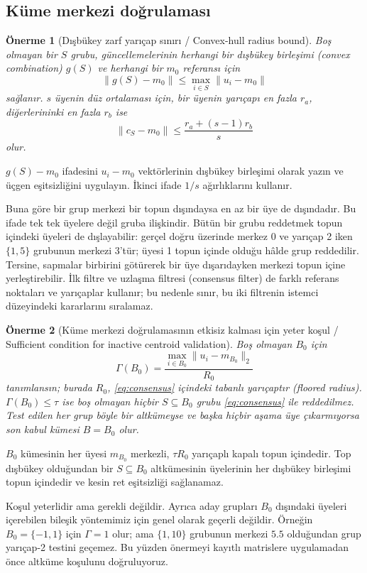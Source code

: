 \documentclass[journal]{IEEEtran}
\newtheorem{proposition}{Önerme}
\begin{document}
\subsection{Küme merkezi doğrulaması}
\begin{proposition}[Dışbükey zarf yarıçap sınırı / Convex-hull radius bound]\label{prop:contraction}
Boş olmayan bir $S$ grubu, güncellemelerinin herhangi bir dışbükey birleşimi (convex combination) $g(S)$ ve herhangi bir $m_0$ referansı için
\[
\|g(S)-m_0\|\leq\max_{i\in S}\|u_i-m_0\|
\]
sağlanır. $s$ üyenin düz ortalaması için, bir üyenin yarıçapı en fazla $r_a$, diğerlerininki en fazla $r_b$ ise
\[
\|c_S-m_0\|\leq\frac{r_a+(s-1)r_b}{s}
\]
olur.
\end{proposition}
\begin{IEEEproof}
$g(S)-m_0$ ifadesini $u_i-m_0$ vektörlerinin dışbükey birleşimi olarak yazın ve üçgen eşitsizliğini uygulayın. İkinci ifade $1/s$ ağırlıklarını kullanır.
\end{IEEEproof}
Buna göre bir grup merkezi bir topun dışındaysa en az bir üye de dışındadır. Bu ifade tek tek üyelere değil gruba ilişkindir. Bütün bir grubu reddetmek topun içindeki üyeleri de dışlayabilir: gerçel doğru üzerinde merkez 0 ve yarıçap 2 iken $\{1,5\}$ grubunun merkezi 3'tür; üyesi 1 topun içinde olduğu hâlde grup reddedilir. Tersine, sapmalar birbirini götürerek bir üye dışarıdayken merkezi topun içine yerleştirebilir. İlk filtre ve uzlaşma filtresi (consensus filter) de farklı referans noktaları ve yarıçaplar kullanır; bu nedenle sınır, bu iki filtrenin istemci düzeyindeki kararlarını sıralamaz.

\begin{proposition}[Küme merkezi doğrulamasının etkisiz kalması için yeter koşul / Sufficient condition for inactive centroid validation]\label{prop:vacuity}
Boş olmayan $B_0$ için
\[
\Gamma(B_0)=\frac{\max_{i\in B_0}\|u_i-m_{B_0}\|_2}{R_0}
\]
tanımlansın; burada $R_0$, \eqref{eq:consensus} içindeki tabanlı yarıçaptır (floored radius). $\Gamma(B_0)\leq\tau$ ise boş olmayan hiçbir $S\subseteq B_0$ grubu \eqref{eq:consensus} ile reddedilmez. Test edilen her grup böyle bir altkümeyse ve başka hiçbir aşama üye çıkarmıyorsa son kabul kümesi $B=B_0$ olur.
\end{proposition}
\begin{IEEEproof}
$B_0$ kümesinin her üyesi $m_{B_0}$ merkezli, $\tau R_0$ yarıçaplı kapalı topun içindedir. Top dışbükey olduğundan bir $S\subseteq B_0$ altkümesinin üyelerinin her dışbükey birleşimi topun içindedir ve kesin ret eşitsizliği sağlanamaz.
\end{IEEEproof}
Koşul yeterlidir ama gerekli değildir. Ayrıca aday grupları $B_0$ dışındaki üyeleri içerebilen bileşik yöntemimiz için genel olarak geçerli değildir. Örneğin $B_0=\{-1,1\}$ için $\Gamma=1$ olur; ama $\{1,10\}$ grubunun merkezi $5.5$ olduğundan grup yarıçap-2 testini geçemez. Bu yüzden önermeyi kayıtlı matrislere uygulamadan önce altküme koşulunu doğruluyoruz.
\end{document}
